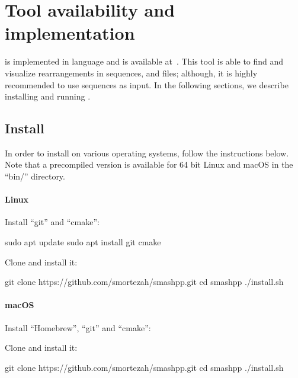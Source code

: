 \clearpage
\section{Tool availability and implementation}
\label{sec.tool}
\smashpp is implemented in \cpp language and is available at~\cite{web-smashpp}. This tool is able to find and visualize rearrangements in sequences, \fasta and \fastq files; although, it is highly recommended to use sequences as input. In the following sections, we describe installing and running \smashpp.

\subsection{Install}
In order to install \smashpp on various operating systems, follow the instructions below. Note that a precompiled version is available for 64 bit Linux and macOS in the ``bin/'' directory.


\paragraph{Linux}
Install ``git'' and ``cmake'':
\begin{code}[style=bash]
sudo apt update
sudo apt install git cmake
\end{code}
Clone \smashpp and install it:
\begin{code}[style=bash]
git clone https://github.com/smortezah/smashpp.git
cd smashpp
./install.sh
\end{code}

\paragraph{macOS}
Install ``Homebrew'', ``git'' and ``cmake'':
Clone \smashpp and install it:
\begin{code}[style=bash]
git clone https://github.com/smortezah/smashpp.git
cd smashpp
./install.sh
\end{code}

